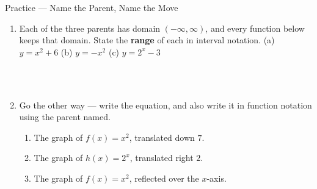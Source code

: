 \documentclass[10pt]{article}
\begin{document}
\begin{notesbox}{Practice --- Name the Parent, Name the Move}
\begin{enumerate}[leftmargin=1.6em, itemsep=6pt, topsep=4pt]
\\
\\
\\

\item Each of the three parents has domain $(-\infty,\infty)$, and every function below keeps that
domain. State the \textbf{range} of each in interval notation.
\quad (a) $y=x^2+6$ \quad (b) $y=-x^2$ \quad (c) $y=2^x-3$

\\
\\

\item Go the other way --- write the equation, and also write it in function notation using the
parent named.
\begin{enumerate}[label=(\alph*), leftmargin=1.6em, itemsep=3pt, topsep=3pt]
  \item The graph of $f(x)=x^2$, translated down $7$.
  \item The graph of $h(x)=2^x$, translated right $2$.
  \item The graph of $f(x)=x^2$, reflected over the $x$-axis.
\end{enumerate}

\\
\\

\end{enumerate}
\end{notesbox}

\vspace{0.10in}
\end{document}
